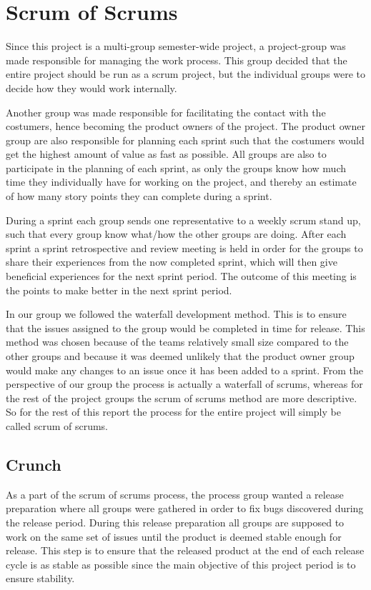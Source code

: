 \section{Scrum of Scrums}
Since this project is a multi-group semester-wide project, a project-group was made responsible for managing the work process.
This group decided that the entire project should be run as a scrum project, but the individual groups were to decide how they would work internally.

Another group was made responsible for facilitating the contact with the costumers, hence becoming the product owners of the project.
The product owner group are also responsible for planning each sprint such that the costumers would get the highest amount of value as fast as possible.
All groups are also to participate in the planning of each sprint, as only the groups know how much time they individually have for working on the project, and thereby an estimate of how many story points they can complete during a sprint.

During a sprint each group sends one representative to a weekly scrum stand up, such that every group know what/how the other groups are doing.
After each sprint a sprint retrospective and review meeting is held in order for the groups to share their experiences from the now completed sprint, which will then give beneficial experiences for the next sprint period.
The outcome of this meeting is the points to make better in the next sprint period.

In our group we followed the waterfall development method. 
This is to ensure that the issues assigned to the group would be completed in time for release. 
This method was chosen because of the teams relatively small size compared to the other groups and because it was deemed unlikely that the product owner group would make any changes to an issue once it has been added to a sprint.
From the perspective of our group the process is actually a waterfall of scrums, whereas for the rest of the project groups the scrum of scrums method are more descriptive.
So for the rest of this report the process for the entire project will simply be called scrum of scrums.

\subsection{Crunch}
As a part of the scrum of scrums process, the process group wanted a release preparation where all groups were gathered in order to fix bugs discovered during the release period. 
During this release preparation all groups are supposed to work on the same set of issues until the product is deemed stable enough for release. 
This step is to ensure that the released product at the end of each release cycle is as stable as possible since the main objective of this project period is to ensure stability.
